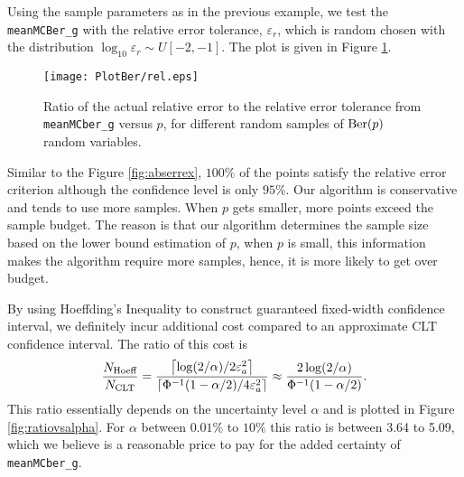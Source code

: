 \documentclass{iitthesis}
\theoremstyle{definition}
\begin{document}
Using the sample parameters as in the previous example, we test the {\tt meanMCBer\_g} with the relative error tolerance, $\varepsilon_r$, which is random chosen with the distribution $\log_{10} \varepsilon_r \sim U[-2,-1]$. The plot is given in Figure \ref{fig:relerrex}.
  \begin{figure}[htbp]
    \centering
    \texttt{[image: PlotBer/rel.eps]} %
    \caption{Ratio of the actual relative error to the relative error tolerance from {\tt meanMCber\_g} versus $p$, for different random samples of $\operatorname{Ber}(p)$ random variables.}
    \label{fig:relerrex}
 \end{figure}
Similar to the Figure \ref{fig:abserrex}, $100\%$ of the points satisfy the relative error criterion although the confidence level is only $95\%$. Our algorithm is conservative and tends to use more samples. When $p$ gets smaller, more points exceed the sample budget. The reason is that our algorithm determines the sample size based on the lower bound estimation of $p$, when $p$ is small, this information makes the algorithm require more samples, hence, it is more likely to get over budget.


By using Hoeffding's Inequality to construct guaranteed fixed-width confidence interval, we definitely incur additional cost compared to an approximate CLT confidence interval.  The ratio of this cost is 
\begin{equation}
\frac{N_{\text{Hoeff}}}{N_{\text{CLT}}} = \frac{\left \lceil \log(2/\alpha)/{2\varepsilon_a^2} \right \rceil}{\left \lceil{ \Phi^{-1}(1-\alpha/2)}/{4 \varepsilon_a^2}\right\rceil} \approx  \frac{2\log(2/\alpha)}{\Phi^{-1}(1-\alpha/2)}.
\end{equation}
This ratio essentially depends on the uncertainty level $\alpha$ and is plotted in Figure \ref{fig:ratiovsalpha}. For $\alpha$ between $0.01\%$ to $10\%$ this ratio is between 3.64 to 5.09, which we believe is a reasonable price to pay for the added certainty of {\tt meanMCber\_g}.
\end{document}
